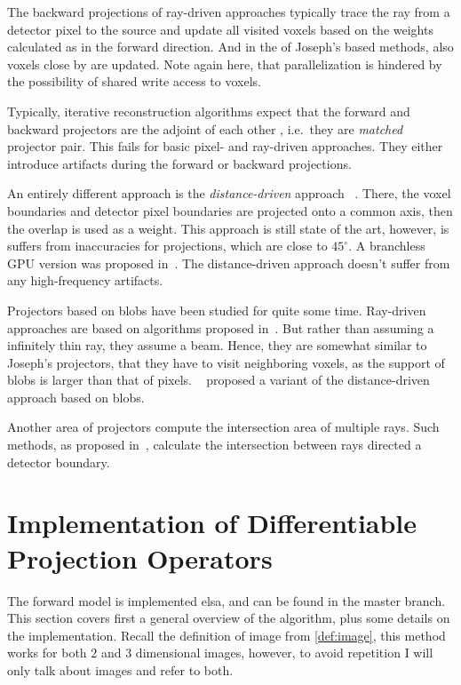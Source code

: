 The backward projections of ray-driven approaches typically trace the ray from a detector pixel to
the source and update all visited voxels based on the weights calculated as in the forward
direction. And in the of Joseph's based methods, also voxels close by are updated. Note again here,
that parallelization is hindered by the possibility of shared write access to voxels.

Typically, iterative reconstruction algorithms expect that the forward and backward projectors are
the adjoint of each other , i.e.\ they are
\textit{matched} projector pair. This fails for basic pixel- and ray-driven approaches.
They either introduce artifacts during the forward or backward projections.

An entirely different approach is the \textit{distance-driven} approach
~\cite{de_man_distance-driven_2002, de_man_distance-driven_2004}. There, the voxel boundaries and
detector pixel boundaries are projected onto a common axis, then the overlap is used as a weight.
This approach is still state of the art, however, is suffers from inaccuracies for projections, which
are close to \(45^\circ\). A branchless \gls{GPU} version was proposed in~\cite{liu_gpu-based_2017}. The
distance-driven approach doesn't suffer from any high-frequency artifacts.

Projectors based on blobs have been studied for quite some time. Ray-driven approaches are based on
algorithms proposed in~\cite{matej_practical_1996, popescu_ray_2004}. But rather than assuming a
infinitely thin ray, they assume a beam. Hence, they are somewhat similar to Joseph's projectors,
that they have to visit neighboring voxels, as the support of blobs is larger than that of pixels.
~\cite{levakhina_distance-driven_2010} proposed a variant of the distance-driven approach based on
blobs.

Another area of projectors compute the intersection area of multiple rays. Such methods, as proposed
in~\cite{ha_study_2015, ha_efficient_2016, ha_look-up_2018}, calculate the intersection between rays
directed a detector boundary.

\section{Implementation of Differentiable Projection Operators}\label{sec:implementation}

The forward model is implemented elsa, and can be found in the master branch. This section covers
first a general overview of the algorithm, plus some details on the implementation. Recall the
definition of image from \autoref{def:image}, this method works for both \(2\) and \(3\) dimensional
images, however, to avoid repetition I will only talk about images and refer to both.

